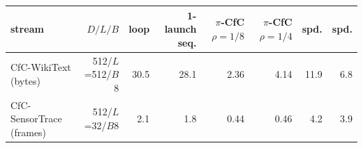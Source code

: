 {\footnotesize\setlength{\tabcolsep}{4pt}
\begin{tabular}{lrrrrrrr}
\toprule
stream & $D/L/B$ & loop & 1-launch seq. & $\pi$-CfC $\rho{=}1/8$ & $\pi$-CfC $\rho{=}1/4$ & spd. & spd. \\
\midrule
CfC-WikiText (bytes) & 512/$L$=512/$B$8 & 30.5 & 28.1 & 2.36 & 4.14 & 11.9 & 6.8 \\
CfC-SensorTrace (frames) & 512/$L$=32/$B$8 & 2.1 & 1.8 & 0.44 & 0.46 & 4.2 & 3.9 \\
\bottomrule
\end{tabular}}
